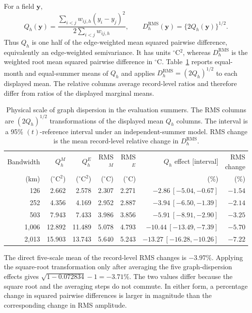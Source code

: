 \documentclass[namedate,webpdf,modern,mediumone]{oup-authoring-template}
\theoremstyle{thmstyleone}
\begin{document}
For a field $\mathbf y$,
\[
 Q_h(\mathbf y)=
 \frac{\sum_{i<j}w_{ij,h}(y_i-y_j)^2}
      {2\sum_{i<j}w_{ij,h}},
 \qquad
 D_h^{\mathrm{RMS}}(\mathbf y)=\{2Q_h(\mathbf y)\}^{1/2}.
\]
Thus $Q_h$ is one half of the edge-weighted mean squared pairwise difference,
equivalently an edge-weighted semivariance. It has units $^\circ$C$^2$, whereas
$D_h^{\mathrm{RMS}}$ is the weighted root mean squared pairwise difference in
$^\circ$C. Table~\ref{tab:physical}
reports equal-month and equal-summer means of $Q_h$ and applies
$D_h^{\mathrm{RMS}}=(2Q_h)^{1/2}$ to each displayed mean. The relative
columns average record-level ratios and therefore differ from ratios of the
displayed marginal means.

\begin{table}[htbp]
\centering
\caption{Physical scale of graph dispersion in the evaluation summers. The RMS
columns are
$(2Q_h)^{1/2}$ transformations of the displayed mean $Q_h$ columns. The
interval is a 95\% $(t)$-reference interval under an independent-summer model. RMS
change is the mean record-level relative change in $D_h^{\mathrm{RMS}}$.}
\label{tab:physical}
\footnotesize
\setlength{\tabcolsep}{4pt}
\begin{tabular}{rrrrrrr}
\toprule
Bandwidth & $Q_h^M$ & $Q_h^E$ & RMS$^M$ & RMS$^E$ & $Q_h$ effect [interval] & RMS change \\
(km) & ($^\circ$C$^2$) & ($^\circ$C$^2$) & ($^\circ$C) & ($^\circ$C) & (\%) & (\%) \\
\midrule
126   & 2.662 & 2.578 & 2.307 & 2.271 & $-2.86\ [-5.04,-0.67]$   & $-1.54$ \\
252   & 4.356 & 4.169 & 2.952 & 2.887 & $-3.94\ [-6.50,-1.39]$   & $-2.14$ \\
503   & 7.943 & 7.433 & 3.986 & 3.856 & $-5.91\ [-8.91,-2.90]$   & $-3.25$ \\
1,006 & 12.892 & 11.489 & 5.078 & 4.793 & $-10.44\ [-13.49,-7.39]$ & $-5.70$ \\
2,013 & 15.903 & 13.743 & 5.640 & 5.243 & $-13.27\ [-16.28,-10.26]$& $-7.22$ \\
\bottomrule
\end{tabular}
\end{table}

The direct five-scale mean of the record-level RMS changes is $-3.97\%$.
Applying the square-root transformation only after averaging the five
graph-dispersion effects gives
$\sqrt{1-0.072834}-1=-3.71\%$. The two values differ because the square root
and the averaging steps do not commute. In either form, a percentage change
in squared pairwise differences is larger in magnitude than the corresponding
change in RMS amplitude.
\end{document}
